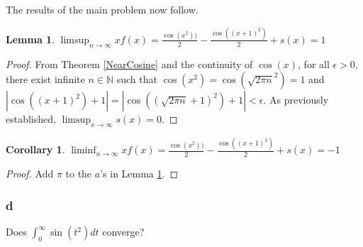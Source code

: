 \documentclass{amsart}
\newtheorem{lemma}[theorem]{Lemma}
\newtheorem{corollary}[theorem]{Corollary}
\begin{document}
The results of the main problem now follow.

\begin{lemma}
\label{limsupResult}
$\limsup_{n\rightarrow\infty} xf(x) = \frac{\cos(x^2))}{2} - \frac{\cos((x+1)^2)}{2} + s(x) = 1$
\end{lemma}

\begin{proof}
From Theorem \ref{NearCosine} and the continuity of $\cos(x)$, for all $\epsilon > 0$, there exist infinite $n \in \mathbb{N}$ such that $\cos(x^2) = \cos(\sqrt{2\pi n}^2) = 1$ and $|\cos\left((x+1)^2\right) + 1| = |\cos\left((\sqrt{2\pi n}+1)^2\right) + 1| < \epsilon$. As previously established, $\limsup_{x\rightarrow\infty} s(x) = 0$. 
\end{proof}

\begin{corollary}
$\liminf_{n\rightarrow\infty} xf(x) = \frac{\cos(x^2))}{2} - \frac{\cos((x+1)^2)}{2} + s(x) = -1$
\end{corollary}

\begin{proof}
Add $\pi$ to the $a$'s in Lemma \ref{limsupResult}.
\end{proof}

\subsubsection*{d}

Does $\int_0^\infty \sin(t^2)dt$ converge?
\end{document}
